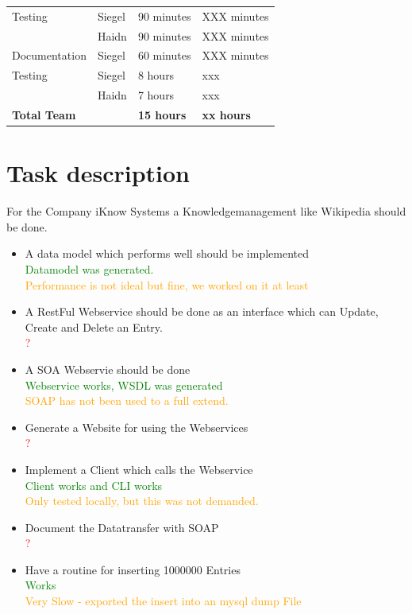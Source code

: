 \documentclass[12pt]{article}
\begin{document}
\begin{table}[h]
\begin{tabular}{|p{}|p{}|p{}|p{}|}
Testing & Siegel &  90  minutes  &  XXX  minutes  \\  
  & Haidn &  90  minutes  &  XXX  minutes   \\ \hline 


Documentation  & Siegel &  60 minutes  &  XXX minutes  \\ \hline 
\hline 

Testing & Siegel &  8 hours  & xxx   \\  
  & Haidn &  7 hours   & xxx   \\ \hline 


 \hline 
\textbf{Total Team} & & \textbf{15 hours} &\textbf{xx hours}  \\ \hline 
\end{tabular}
\end{table}

\section{Task description}
For the Company iKnow Systems a Knowledgemanagement like Wikipedia should be done.
\begin{itemize}
\item A data model which performs well should be implemented\\
\textcolor{green}{Datamodel was generated.} \\
\textcolor{orange}{Performance is not ideal but fine, we worked on it at least}
\item A RestFul Webservice should be done as an interface which can Update, Create and Delete an Entry.\\
\textcolor{red}{?}
\item A SOA Webservie should be done\\
\textcolor{green}{Webservice works, WSDL was generated} \\
\textcolor{orange}{SOAP has not been used to a full extend.}
\item Generate a Website for using the Webservices\\
\textcolor{red}{?}
\item Implement a Client which calls the Webservice\\
\textcolor{green}{Client works and CLI works} \\
\textcolor{orange}{Only tested locally, but this was not demanded.}
\item Document the Datatransfer with SOAP\\
\textcolor{red}{?}
\item Have a routine for inserting 1000000 Entries \\
\textcolor{green}{Works} \\
\textcolor{orange}{Very Slow - exported the insert into an mysql dump File}
\end{itemize}
\end{document}
